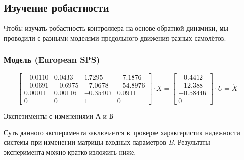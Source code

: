 \subsection{Изучение робастности} 

Чтобы изучать робастность контроллера на основе обратной динамики, мы проводили  с разными моделями продольного движения разных самолётов. 

\subsubsection{Модель (European SPS)} 
    $$\begin{bmatrix}
        -0.0110 & 0.0433 & 1.7295 & -7.1876\\ 
        -0.0691 & -0.6975 & -7.0678 & -54.8976\\ 
        0.00011 & 0.00116 & -0.35407 & 0.0911\\ 
        0 & 0 & 1 & 0
    \end{bmatrix} \cdot X=\begin{bmatrix}
        -0.4412\\ 
        -12.388\\ 
        -0.58446 \\ 
        0
\end{bmatrix} \cdot U=\dot{X}$$
\begin{center}
    Эксперименты с изменениями А и В
\end{center}

Суть данного эксперимента заключается в проверке характеристик надежности системы при изменении матрицы входных параметров $B$. Результаты эксперимента можно кратко изложить ниже.
    
